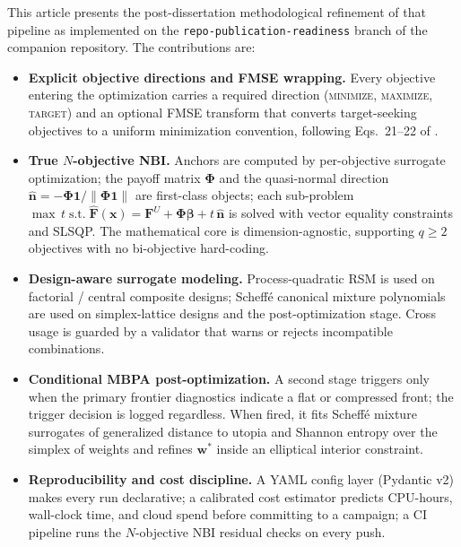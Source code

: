 This article presents the post-dissertation methodological refinement
of that pipeline as implemented on the
\texttt{repo-publication-readiness} branch of the companion repository.
The contributions are:
\begin{itemize}[leftmargin=1.2em]
  \item \textbf{Explicit objective directions and FMSE wrapping.}
        Every objective entering the optimization carries a required
        direction (\textsc{minimize}, \textsc{maximize},
        \textsc{target}) and an optional FMSE transform that converts
        target-seeking objectives to a uniform minimization convention,
        following Eqs.~21--22 of \citet{pereira2025eaai}.
  \item \textbf{True $N$-objective NBI.} Anchors are computed by
        per-objective surrogate optimization; the payoff matrix
        $\bm{\Phi}$ and the quasi-normal direction
        $\hat{\bm n} = -\bm{\Phi}\bm{1}/\|\bm{\Phi}\bm{1}\|$ are
        first-class objects; each sub-problem
        $\max\,t\;\text{s.t.}\;\hat{\bm F}(\bm x) = \bm F^{U} +
        \bm{\Phi}\bm\beta + t\,\hat{\bm n}$ is solved with vector
        equality constraints and SLSQP. The mathematical core is
        dimension-agnostic, supporting $q\ge 2$ objectives with no
        bi-objective hard-coding.
  \item \textbf{Design-aware surrogate modeling.} Process-quadratic
        RSM is used on factorial / central composite designs;
        Scheff\'{e} canonical mixture polynomials are used on
        simplex-lattice designs and the post-optimization stage. Cross
        usage is guarded by a validator that warns or rejects
        incompatible combinations.
  \item \textbf{Conditional MBPA post-optimization.} A second stage
        triggers only when the primary frontier diagnostics indicate a
        flat or compressed front; the trigger decision is logged
        regardless. When fired, it fits Scheff\'{e} mixture
        surrogates of generalized distance to utopia and Shannon
        entropy over the simplex of weights and refines $\bm w^{*}$
        inside an elliptical interior constraint.
  \item \textbf{Reproducibility and cost discipline.} A YAML config
        layer (Pydantic v2) makes every run declarative; a calibrated
        cost estimator predicts CPU-hours, wall-clock time, and cloud
        spend before committing to a campaign; a CI pipeline runs the
        $N$-objective NBI residual checks on every push.
\end{itemize}

